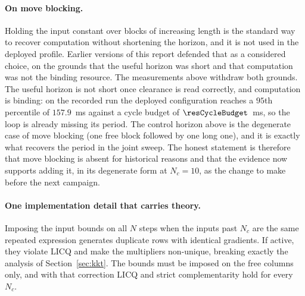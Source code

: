 \documentclass[11pt,a4paper]{article}
\newcommand{\Ninput}{N_c}
\begin{document}
\paragraph{On move blocking.} Holding the input constant over blocks of increasing length is the standard way~\cite{cagienard2007moveblocking}
to recover computation without shortening the horizon, and it is not used in the deployed profile. Earlier
versions of this report defended that as a considered choice, on the grounds that the useful horizon was
short and that computation was not the binding resource. The measurements above withdraw both grounds. The
useful horizon is not short once clearance is read correctly, and computation is binding: on the recorded run
the deployed configuration reaches a $95$th percentile of $157.9$~ms against a cycle budget of
$\resCycleBudget$~ms, so the loop is already missing its period. The control horizon above is the degenerate
case of move blocking (one free block followed by one long one), and it is exactly what recovers the
period in the joint sweep. The honest statement is therefore that move blocking is absent for historical
reasons and that the evidence now supports adding it, in its degenerate form at $\Ninput=10$, as the change
to make before the next campaign.

\paragraph{One implementation detail that carries theory.} Imposing the input bounds on all $N$ steps when
the inputs past $\Ninput$ are the same repeated expression generates duplicate rows with identical gradients.
If active, they violate LICQ and make the multipliers non-unique, breaking exactly the analysis of
Section~\ref{sec:kkt}. The bounds must be imposed on the free columns only, and with that correction LICQ and
strict complementarity hold for every $\Ninput$.


\end{document}
